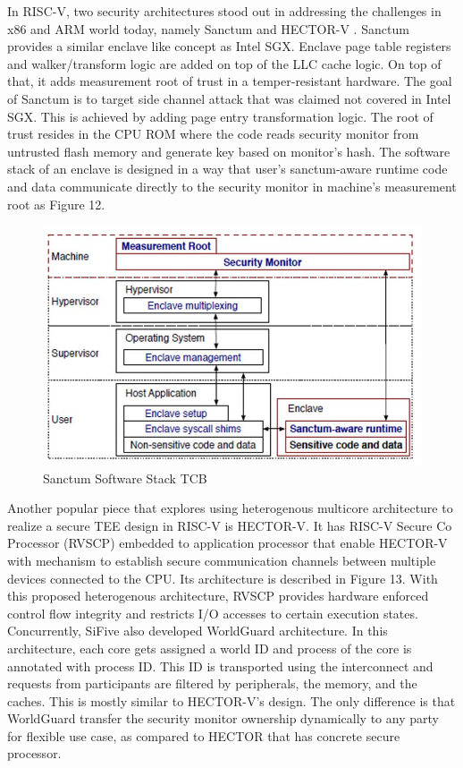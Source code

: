 \documentclass[review]{elsarticle}
\begin{document}
In RISC-V, two security architectures stood out in addressing the challenges in x86 and ARM world today, namely Sanctum \cite{R5:6} and HECTOR-V \cite{R5:5}. Sanctum provides a similar enclave like concept as Intel SGX. Enclave page table registers and walker/transform logic are added on top of the LLC cache logic. On top of that, it adds measurement root of trust in a temper-resistant hardware. The goal of Sanctum is to target side channel attack that was claimed not covered in Intel SGX. This is achieved by adding page entry transformation logic. The root of trust resides in the CPU ROM where the code reads security monitor from untrusted flash memory and generate key based on monitor’s hash. The software stack of an enclave is designed in a way that user’s sanctum-aware runtime code and data communicate directly to the security monitor in machine’s measurement root as Figure 12.

\begin{figure}[H]
	\centering
	\includegraphics[width=1\textwidth]{figs/SanctumSwStack.JPG}
	\caption{Sanctum Software Stack TCB \cite{R5:5}}
\end{figure}

Another popular piece that explores using heterogenous multicore architecture to realize a secure TEE design in RISC-V is HECTOR-V. It has RISC-V Secure Co Processor (RVSCP) embedded to application processor that enable HECTOR-V with mechanism to establish secure communication channels between multiple devices connected to the CPU. Its architecture is described in Figure 13. With this proposed heterogenous architecture, RVSCP provides hardware enforced control flow integrity and restricts I/O accesses to certain execution states. Concurrently, SiFive also developed WorldGuard architecture. In this architecture, each core gets assigned a world ID and process of the core is annotated with process ID. This ID is transported using the interconnect and requests from participants are filtered by peripherals, the memory, and the caches. This is mostly similar to HECTOR-V’s design. The only difference is that WorldGuard transfer the security monitor ownership dynamically to any party for flexible use case, as compared to HECTOR that has concrete secure processor.
\end{document}
